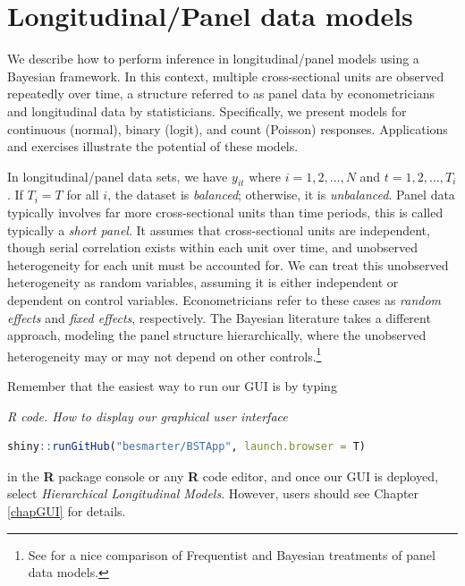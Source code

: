 \chapter{Longitudinal/Panel data models}\label{chap9}

We describe how to perform inference in longitudinal/panel models using a Bayesian framework. In this context, multiple cross-sectional units are observed repeatedly over time, a structure referred to as panel data by econometricians and longitudinal data by statisticians. Specifically, we present models for continuous (normal), binary (logit), and count (Poisson) responses. Applications and exercises illustrate the potential of these models.

In longitudinal/panel data sets, we have $y_{it}$ where $i=1,2,\dots,N$ and $t=1,2,\dots,T_i$. If $T_i=T$ for all $i$, the dataset is \textit{balanced}; otherwise, it is \textit{unbalanced}. Panel data typically involves far more cross-sectional units than time periods, this is called typically a \textit{short panel}. It assumes that cross-sectional units are independent, though serial correlation exists within each unit over time, and unobserved heterogeneity for each unit must be accounted for. We can treat this unobserved heterogeneity as random variables, assuming it is either independent or dependent on control variables. Econometricians refer to these cases as \textit{random effects} and \textit{fixed effects}, respectively. The Bayesian literature takes a different approach, modeling the panel structure hierarchically, where the unobserved heterogeneity may or may not depend on other controls.\footnote{See \cite{rendon2013fixed} for a nice comparison of Frequentist and Bayesian treatments of panel data models.}

Remember that the easiest way to run our GUI is by typing

\begin{tcolorbox}[enhanced,width=4.67in,center upper,
	fontupper=\large\bfseries,drop shadow southwest,sharp corners]
	\textit{R code. How to display our graphical user interface}
	\begin{VF}
	\begin{lstlisting}[language=R]
	shiny::runGitHub("besmarter/BSTApp", launch.browser = T)\end{lstlisting}
	\end{VF}
\end{tcolorbox} 

in the \textbf{R} package console or any \textbf{R} code editor, and once our GUI is deployed, select \textit{Hierarchical Longitudinal Models}. However, users should see Chapter \ref{chapGUI} for details.

